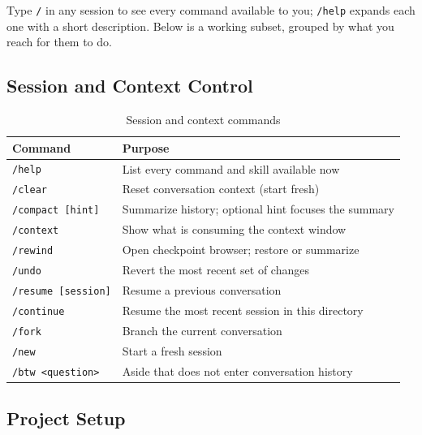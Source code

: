 Type \texttt{/} in any session to see every command available to you;
\texttt{/help} expands each one with a short description. Below is a
working subset, grouped by what you reach for them to do.

\subsection{Session and Context Control}

\begin{table}[ht]
\centering
\caption{Session and context commands}
\label{tab:cmd-session}
\begin{tabularx}{\textwidth}{lX}
\toprule
\textbf{Command} & \textbf{Purpose} \\
\midrule
\texttt{/help}              & List every command and skill available now \\
\texttt{/clear}             & Reset conversation context (start fresh) \\
\texttt{/compact [hint]}    & Summarize history; optional hint focuses the summary \\
\texttt{/context}           & Show what is consuming the context window \\
\texttt{/rewind}            & Open checkpoint browser; restore or summarize \\
\texttt{/undo}              & Revert the most recent set of changes \\
\texttt{/resume [session]}  & Resume a previous conversation \\
\texttt{/continue}          & Resume the most recent session in this directory \\
\texttt{/fork}              & Branch the current conversation \\
\texttt{/new}               & Start a fresh session \\
\texttt{/btw <question>}    & Aside that does not enter conversation history \\
\bottomrule
\end{tabularx}
\end{table}

\subsection{Project Setup}

